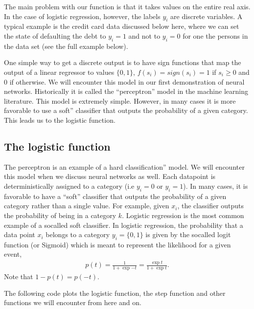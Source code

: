 \documentclass[letterpaper,10pt,english]{sphinxmanual}
\begin{document}
The main problem with our function is that it takes values on the
entire real axis. In the case of logistic regression, however, the
labels \(y_i\) are discrete variables. A typical example is the credit
card data discussed below here, where we can set the state of
defaulting the debt to \(y_i=1\) and not to \(y_i=0\) for one the persons
in the data set (see the full example below).

One simple way to get a discrete output is to have sign
functions that map the output of a linear regressor to values \(\{0,1\}\),
\(f(s_i)=sign(s_i)=1\) if \(s_i\ge 0\) and 0 if otherwise.
We will encounter this model in our first demonstration of neural networks. Historically it is called the “perceptron” model in the machine learning
literature. This model is extremely simple. However, in many cases it is more
favorable to use a \textasciigrave{}\textasciigrave{}soft” classifier that outputs
the probability of a given category. This leads us to the logistic function.


\subsection{The logistic function}
\label{\detokenize{chapter5:the-logistic-function}}
The perceptron is an example of a \textasciigrave{}\textasciigrave{}hard classification” model. We
will encounter this model when we discuss neural networks as
well. Each datapoint is deterministically assigned to a category (i.e
\(y_i=0\) or \(y_i=1\)). In many cases, it is favorable to have a “soft”
classifier that outputs the probability of a given category rather
than a single value. For example, given \(x_i\), the classifier
outputs the probability of being in a category \(k\).  Logistic regression
is the most common example of a so\sphinxhyphen{}called soft classifier. In logistic
regression, the probability that a data point \(x_i\)
belongs to a category \(y_i=\{0,1\}\) is given by the so\sphinxhyphen{}called logit function (or Sigmoid) which is meant to represent the likelihood for a given event,
\begin{equation*}
\begin{split}
p(t) = \frac{1}{1+\mathrm \exp{-t}}=\frac{\exp{t}}{1+\mathrm \exp{t}}.
\end{split}
\end{equation*}
Note that \(1-p(t)= p(-t)\).

The following code plots the logistic function, the step function and other functions we will encounter from here and on.
\end{document}
